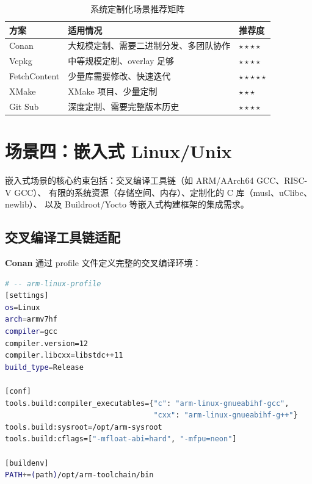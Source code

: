\documentclass[12pt,a4paper,fontset=fandol]{ctexbook}
\begin{document}
\begin{table}[H]
\centering
\caption{系统定制化场景推荐矩阵}
\label{tab:scenario3-rec}
\small
\begin{tabularx}{\textwidth}{l X l}
\toprule
\textbf{方案} & \textbf{适用情况} & \textbf{推荐度} \\
\midrule
Conan      & 大规模定制、需要二进制分发、多团队协作 & $\star\star\star\star$ \\
Vcpkg      & 中等规模定制、overlay 足够         & $\star\star\star\star$ \\
FetchContent & 少量库需要修改、快速迭代           & $\star\star\star\star\star$ \\
XMake      & XMake 项目、少量定制              & $\star\star\star$ \\
Git Sub    & 深度定制、需要完整版本历史          & $\star\star\star\star$ \\
\bottomrule
\end{tabularx}
\end{table}

\section{场景四：嵌入式 Linux/Unix}

嵌入式场景的核心约束包括：交叉编译工具链（如 ARM/AArch64 GCC、RISC-V GCC）、
有限的系统资源（存储空间、内存）、定制化的 C 库（musl、uClibc、newlib）、
以及 Buildroot/Yocto 等嵌入式构建框架的集成需求。

\subsection{交叉编译工具链适配}

\textbf{Conan} 通过 profile 文件定义完整的交叉编译环境：

\begin{lstlisting}[language=Bash, caption={Conan 交叉编译 profile}]
# -- arm-linux-profile
[settings]
os=Linux
arch=armv7hf
compiler=gcc
compiler.version=12
compiler.libcxx=libstdc++11
build_type=Release

[conf]
tools.build:compiler_executables={"c": "arm-linux-gnueabihf-gcc",
                                  "cxx": "arm-linux-gnueabihf-g++"}
tools.build:sysroot=/opt/arm-sysroot
tools.build:cflags=["-mfloat-abi=hard", "-mfpu=neon"]

[buildenv]
PATH+=(path)/opt/arm-toolchain/bin
\end{lstlisting}
\end{document}
